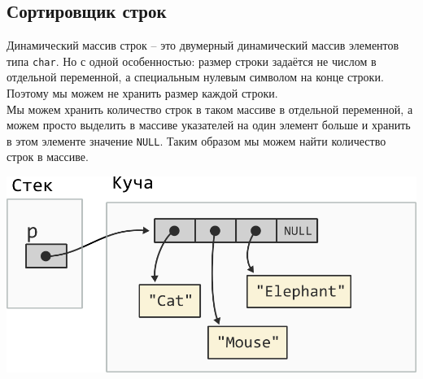 \documentclass[10pt]{article}
\begin{document}
\newpage
\subsection{Сортировщик строк}
Динамический массив строк -- это двумерный динамический массив элементов типа \texttt{char}. 
Но с одной особенностью: размер строки задаётся не числом в отдельной переменной, а специальным нулевым символом на конце строки. Поэтому мы можем не хранить размер каждой строки. \\
Мы можем хранить количество строк в таком массиве в отдельной переменной, а можем просто выделить в массиве указателей на один элемент больше и хранить в этом элементе значение \texttt{NULL}. Таким образом мы можем найти количество строк в массиве.\\


\begin{center}
\includegraphics[scale=0.8]{../images/malloc_homework/12string_array_heap.png}
\end{center}
\end{document}
